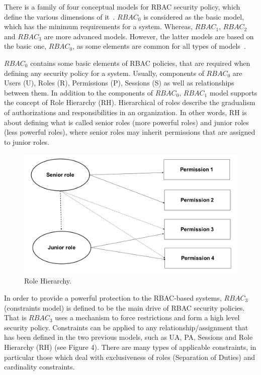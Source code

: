 There is a family of four conceptual models for RBAC security policy, which define the various dimensions of it~\cite{PTN2009}. $RBAC_0$ is considered as the basic model, which has the minimum requirements for a system.  Whereas, $RBAC_1$, $RBAC_2$ and $RBAC_3$ are more advanced models.  However, the latter models are based on the basic one, $RBAC_0$, as some elements are common for all types of models~\cite{AhHu2007}.

$RBAC_0$ contains some basic elements of RBAC policies, that are required when defining any security policy for a system.  Usually, components of $RBAC_0$ are Users (U), Roles (R), Permissions (P), Sessions (S) as well as relationships between them. In addition to the components of $RBAC_0$, $RBAC_1$ model supports the concept of Role Hierarchy (RH).  Hierarchical of roles describe the gradualism of authorizations and responsibilities in an organization.  In other words, RH is about defining what is called senior roles (more powerful roles) and junior roles (less powerful roles), where senior roles may inherit permissions that are assigned to junior roles.

\begin{figure}[bht]
\centering
\includegraphics[scale=0.26]{RolesHierachy.png}
\caption{Role Hierarchy.}
\label{fig:RBACPol}
\end{figure}

In order to provide a powerful protection to the RBAC-based systems, $RBAC_3$ (constraints model) is defined to be the main drive of RBAC security policies.  That is $RBAC_3$ uses a mechanism to force restrictions and form a high level security policy.  Constraints can be applied to any relationship/assignment that has been defined in the two previous models, such as UA, PA, Sessions and Role Hierarchy (RH) (see Figure 4).  There are many types of applicable constraints, in particular those which deal with exclusiveness of roles (Separation of Duties) and cardinality constraints.


